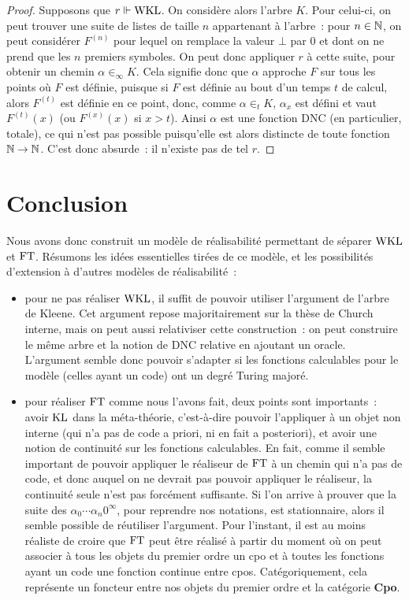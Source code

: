 \documentclass{article}
\begin{document}
\begin{proof}
    Supposons que $r \Vdash \mathrm{WKL}$. On considère alors l'arbre $K$. Pour celui-ci, on peut trouver une suite de listes de taille $n$ appartenant à l'arbre~: pour $n\in \mathbb{N}$, on peut considérer $F^{(n)}$ pour lequel on remplace la valeur $\bot$ par $0$ et dont on ne prend que les $n$ premiers symboles. On peut donc appliquer $r$ à cette suite, pour obtenir un chemin $\alpha \in_\infty K$. Cela signifie donc que $\alpha$ approche $F$ sur tous les points où $F$ est définie, puisque si $F$ est définie au bout d'un temps $t$ de calcul, alors $F^{(t)}$ est définie en ce point, donc, comme $\alpha \in_t K$, $\alpha_x$ est défini et vaut $F^{(t)}(x)$ (ou $F^{(x)}(x)$ si $x > t$). Ainsi $\alpha$ est une fonction DNC (en particulier, totale), ce qui n'est pas possible puisqu'elle est alors distincte de toute fonction $\mathbb{N} \to \mathbb{N}$. C'est donc absurde~: il n'existe pas de tel $r$.
\end{proof}

\section{Conclusion}

Nous avons donc construit un modèle de réalisabilité permettant de séparer $\mathrm{WKL}$ et $\mathrm{FT}$. Résumons les idées essentielles tirées de ce modèle, et les possibilités d'extension à d'autres modèles de réalisabilité~:
\begin{itemize}
    \item pour ne pas réaliser $\mathrm{WKL}$, il suffit de pouvoir utiliser l'argument de l'arbre de Kleene. Cet argument repose majoritairement sur la thèse de Church interne, mais on peut aussi relativiser cette construction~: on peut construire le même arbre et la notion de DNC relative en ajoutant un oracle. L'argument semble donc pouvoir s'adapter si les fonctions calculables pour le modèle (celles ayant un code) ont un degré Turing majoré.
    \item pour réaliser $\mathrm{FT}$ comme nous l'avons fait, deux points sont importants~: avoir $\mathrm{KL}$ dans la méta-théorie, c'est-à-dire pouvoir l'appliquer à un objet non interne (qui n'a pas de code a priori, ni en fait a posteriori), et avoir une notion de continuité sur les fonctions calculables. En fait, comme il semble important de pouvoir appliquer le réaliseur de $\mathrm{FT}$ à un chemin qui n'a pas de code, et donc auquel on ne devrait pas pouvoir appliquer le réaliseur, la continuité seule n'est pas forcément suffisante. Si l'on arrive à prouver que la suite des $\alpha_0\cdots\alpha_n 0^\infty$, pour reprendre nos notations, est stationnaire, alors il semble possible de réutiliser l'argument. Pour l'instant, il est au moins réaliste de croire que $\mathrm{FT}$ peut être réalisé à partir du moment où on peut associer à tous les objets du premier ordre un cpo et à toutes les fonctions ayant un code une fonction continue entre cpos. Catégoriquement, cela représente un foncteur entre nos objets du premier ordre et la catégorie \textbf{Cpo}.
\end{itemize}
\end{document}
